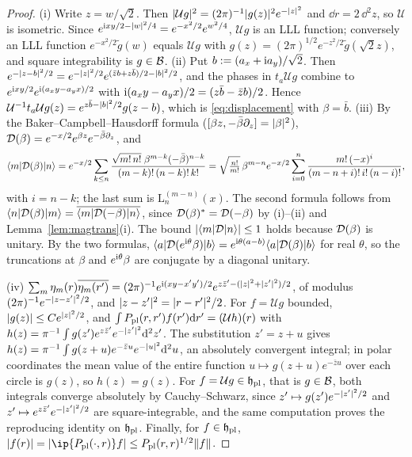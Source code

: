 \begin{proof}
(i) Write $z=w/\sqrt2$. Then $\lvert\mathcal U g\rvert^2=(2\pi)^{-1}\lvert g(z)\rvert^2e^{-\lvert z\rvert^2}$ and $\dd r=2\,\dd^2z$, so $\mathcal U$ is
isometric. Since $e^{\mathrm{i} xy/2-\lvert w\rvert^2/4}=e^{-x^2/2}e^{w^2/4}$, $\mathcal U g$ is an LLL function; conversely an LLL function
$e^{-x^2/2}\tilde g(w)$ equals $\mathcal U g$ with $g(z)=(2\pi)^{1/2}e^{-z^2/2}\tilde g(\sqrt2z)$, and square integrability is
$g\in\mathcal{B}$. (ii) Put $b:=(a_x+\mathrm{i} a_y)/\sqrt2$. Then $e^{-\lvert z-b\rvert^2/2}=e^{-\lvert z\rvert^2/2}e^{(\bar zb+z\bar b)/2-\lvert b\rvert^2/2}$,
and the phases in $t_a\mathcal U g$ combine to $e^{\mathrm{i} xy/2}e^{\mathrm{i}(a_xy-a_yx)/2}$ with $\mathrm{i}(a_xy-a_yx)/2=(z\bar b-\bar zb)/2$.
Hence $\mathcal U^{-1}t_a\mathcal U g(z)=e^{z\bar b-\lvert b\rvert^2/2}g(z-b)$, which is \eqref{eq:displacement} with $\beta=\bar b$.
(iii) By the Baker--Campbell--Hausdorff formula ($[\beta z,-\bar\beta\partial_z]=\lvert\beta\rvert^2$),
$\mathcal{D}(\beta)=e^{-x/2}e^{\beta z}e^{-\bar\beta\partial_z}$, and
\[
\langle m\rvert\mathcal{D}(\beta)\lvert n\rangle=e^{-x/2}\sum_{k\le n}\frac{\sqrt{m!\,n!}\;\beta^{m-k}(-\bar\beta)^{n-k}}{(m-k)!\,(n-k)!\,k!}
=\sqrt{\tfrac{n!}{m!}}\,\beta^{m-n}e^{-x/2}\sum_{i=0}^n\frac{m!\,(-x)^i}{(m-n+i)!\,i!\,(n-i)!},
\]
with $i=n-k$; the last sum is $\mathrm L_n^{(m-n)}(x)$. The second formula follows from
$\langle n\rvert\mathcal{D}(\beta)\lvert m\rangle=\overline{\langle m\rvert\mathcal{D}(-\beta)\lvert n\rangle}$, since $\mathcal{D}(\beta)^*=\mathcal{D}(-\beta)$ by (i)--(ii) and
Lemma~\ref{lem:magtrans}(i). The bound $\lvert\langle m\rvert\mathcal{D}\lvert n\rangle\rvert\le1$ holds because $\mathcal{D}(\beta)$ is unitary. By the two
formulas, $\langle a\rvert\mathcal{D}(e^{\mathrm{i}\theta}\beta)\lvert b\rangle=e^{\mathrm{i}\theta(a-b)}\langle a\rvert\mathcal{D}(\beta)\lvert b\rangle$ for real $\theta$, so the truncations
at $\beta$ and $e^{\mathrm{i}\theta}\beta$ are conjugate by a diagonal unitary.

(iv) $\sum_m\eta_m(r)\overline{\eta_m(r')}=(2\pi)^{-1}e^{\mathrm{i}(xy-x'y')/2}e^{z\bar z'-(\lvert z\rvert^2+\lvert z'\rvert^2)/2}$, of modulus
$(2\pi)^{-1}e^{-\lvert z-z'\rvert^2/2}$, and $\lvert z-z'\rvert^2=\lvert r-r'\rvert^2/2$. For $f=\mathcal U g$ bounded, $\lvert g(z)\rvert\le Ce^{\lvert z\rvert^2/2}$, and
$\int P_{\mathrm{pl}}(r,r')f(r')\mathrm{d} r'=(\mathcal U h)(r)$ with $h(z)=\pi^{-1}\int g(z')e^{z\bar z'}e^{-\lvert z'\rvert^2}\mathrm{d}^2z'$. The substitution
$z'=z+u$ gives $h(z)=\pi^{-1}\int g(z+u)e^{-\bar zu}e^{-\lvert u\rvert^2}\mathrm{d}^2u$, an absolutely convergent integral; in polar
coordinates the mean value of the entire function $u\mapsto g(z+u)e^{-\bar zu}$ over each circle is $g(z)$, so
$h(z)=g(z)$. For $f=\mathcal U g\in\mathfrak{h}_{\mathrm{pl}}$, that is $g\in\mathcal{B}$, both integrals converge absolutely by Cauchy--Schwarz, since
$z'\mapsto g(z')e^{-\lvert z'\rvert^2/2}$ and $z'\mapsto e^{z\bar z'}e^{-\lvert z'\rvert^2/2}$ are square-integrable, and the same computation
proves the reproducing identity on $\mathfrak{h}_{\mathrm{pl}}$. Finally, for $f\in\mathfrak{h}_{\mathrm{pl}}$, $\abs{f(r)}=\abs{\ip{\Ppl(\cdot,r)}f}\le \Ppl(r,r)^{1/2}\norm f$.
\end{proof}


